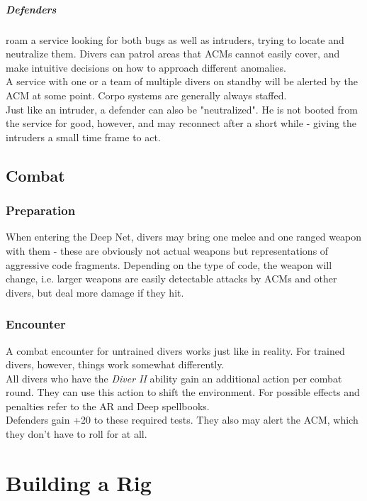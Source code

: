 \documentclass[12pt,a4paper,openany,usenames,dvipsnames]{book}
\begin{document}
	\paragraph{Defenders}
		roam a service looking for both bugs as well as intruders, trying to locate and neutralize them.
		Divers can patrol areas that ACMs cannot easily cover, and make intuitive decisions on how to approach different anomalies.
		\\%
		A service with one or a team of multiple divers on standby will be alerted by the ACM at some point.
		Corpo systems are generally always staffed.
		\\%
		Just like an intruder, a defender can also be "neutralized".
		He is not booted from the service for good, however, and may reconnect after a short while
			- giving the intruders a small time frame to act.
	\section{Combat}
    \subsection*{Preparation}
    When entering the Deep Net,
        divers may bring one melee and one ranged weapon with them
        - these are obviously not actual weapons but representations of aggressive code fragments.
    Depending on the type of code, the weapon will change,
        i.e. larger weapons are easily detectable attacks by ACMs and other divers,
        but deal more damage if they hit.
    \subsection*{Encounter}
    A combat encounter for untrained divers works just like in reality.
    For trained divers, however, things work somewhat differently.
    \\%
    All divers who have the \emph{Diver II} ability gain an additional action per combat round.
    They can use this action to shift the environment.
    For possible effects and penalties refer to the AR and Deep spellbooks.
    \\%
    Defenders gain +20 to these required tests.
    They also may alert the ACM, which they don't have to roll for at all.

	\chapter{Building a Rig}
	\label{ch:rigs}
\end{document}
